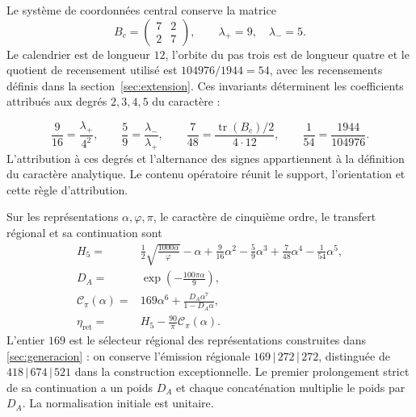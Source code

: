 Le système de coordonnées central conserve la matrice
\[
 B_c=\begin{pmatrix}7&2\\2&7\end{pmatrix},
 \qquad\lambda_+=9,\quad\lambda_-=5.
\]
Le calendrier est de longueur \(12\), l’orbite du pas trois est de
longueur quatre et le quotient de recensement utilisé est
\(104976/1944=54\), avec les recensements définis dans la
section~\ref{sec:extension}. Ces invariants déterminent les coefficients
attribués aux degrés \(2,3,4,5\) du caractère :

\begin{equation}
 \frac9{16}=\frac{\lambda_+}{4^2},\qquad
 \frac59=\frac{\lambda_-}{\lambda_+},\qquad
 \frac7{48}=\frac{\operatorname{tr}(B_c)/2}{4\cdot12},
 \qquad
 \frac1{54}=\frac{1944}{104976}.
 \label{iv:action:coeficientes}
\end{equation}
L’attribution à ces degrés et l’alternance des signes appartiennent
à la définition du caractère analytique. Le contenu opératoire
réunit le support, l’orientation et cette règle d’attribution.

\begin{definition}
\label{iv:action:lectores}
Sur les représentations \(\alpha,\varphi,\pi\), le caractère de
cinquième ordre, le transfert régional et sa continuation sont
\begin{align}
 H_5={}&\frac12\sqrt{\frac{1000\alpha}{\varphi}}-\alpha
       +\frac9{16}\alpha^2-\frac59\alpha^3
       +\frac7{48}\alpha^4-\frac1{54}\alpha^5,
       \label{iv:action:h5}\\
 D_A={}&\exp\!\left(-\frac{100\pi\alpha}{9}\right),
       \label{iv:action:da}\\
 \mathcal C_\pi(\alpha)={}&169\alpha^6+
       \frac{D_A\alpha^7}{1-D_A\alpha},
       \label{iv:action:cpi}\\
 \eta_{\mathrm{ret}}={}&H_5-\frac{90}{\pi}\mathcal C_\pi(\alpha).
       \label{iv:action:eta-ret}
\end{align}
L’entier \(169\) est le sélecteur régional des représentations
construites dans \ref{sec:generacion} : on conserve l’émission régionale
\(169\,|\,272\,|\,272\), distinguée de
\(418\,|\,674\,|\,521\) dans la construction exceptionnelle.
Le premier prolongement strict de sa continuation
a un poids \(D_A\) et chaque concaténation multiplie le poids par
\(D_A\). La normalisation initiale est unitaire.
\end{definition}

